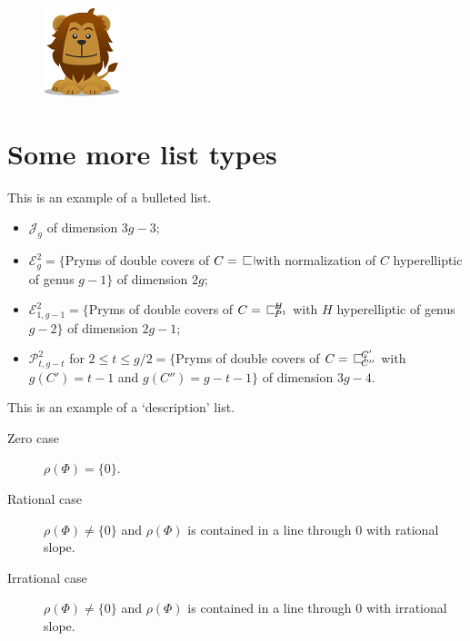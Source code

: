 \documentclass{amsart}
\theoremstyle{definition}
\theoremstyle{remark}
\numberwithin{equation}{section}
\newcommand{\blankbox}[2]{%
  \parbox{\columnwidth}{\centering
    \setlength{\fboxsep}{0pt}%
    \fbox{\raisebox{0pt}[#2]{\hspace{#1}}}%
  }%
}
\begin{document}
\begin{figure}[tb]
\includegraphics{fig/lion.png}
\caption{}\label{otherfig}
\end{figure}

\section{Some more list types}
This is an example of a bulleted list.

\begin{itemize}
\item $\mathcal{J}_g$ of dimension $3g-3$;
\item $\mathcal{E}^2_g=\{$Pryms of double covers of $C=\openbox$ with
normalization of $C$ hyperelliptic of genus $g-1\}$ of dimension $2g$;
\item $\mathcal{E}^2_{1,g-1}=\{$Pryms of double covers of
$C=\openbox^H_{P^1}$ with $H$ hyperelliptic of genus $g-2\}$ of
dimension $2g-1$;
\item $\mathcal{P}^2_{t,g-t}$ for $2\le t\le g/2=\{$Pryms of double
covers of $C=\openbox^{C'}_{C''}$ with $g(C')=t-1$ and $g(C'')=g-t-1\}$
of dimension $3g-4$.
\end{itemize}

This is an example of a `description' list.

\begin{description}
\item[Zero case] $\rho(\Phi) = \{0\}$.

\item[Rational case] $\rho(\Phi) \ne \{0\}$ and $\rho(\Phi)$ is
contained in a line through $0$ with rational slope.

\item[Irrational case] $\rho(\Phi) \ne \{0\}$ and $\rho(\Phi)$ is
contained in a line through $0$ with irrational slope.
\end{description}

\nocite{*}


\end{document}
